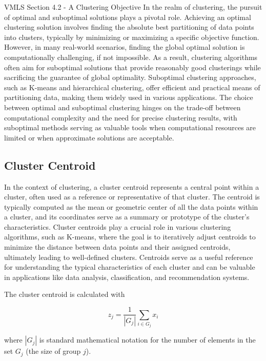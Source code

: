 \begin{notes}{VMLS Section 4.2 - A Clustering Objective}
    In the realm of clustering, the pursuit of optimal and suboptimal solutions plays a pivotal role. Achieving an optimal clustering solution involves finding the absolute best partitioning of data points 
    into clusters, typically by minimizing or maximizing a specific objective function. However, in many real-world scenarios, finding the global optimal solution is computationally challenging, if not 
    impossible. As a result, clustering algorithms often aim for suboptimal solutions that provide reasonably good clusterings while sacrificing the guarantee of global optimality. Suboptimal clustering 
    approaches, such as K-means and hierarchical clustering, offer efficient and practical means of partitioning data, making them widely used in various applications. The choice between optimal and suboptimal 
    clustering hinges on the trade-off between computational complexity and the need for precise clustering results, with suboptimal methods serving as valuable tools when computational resources are limited 
    or when approximate solutions are acceptable.

    \subsection*{Cluster Centroid}

    In the context of clustering, a cluster centroid represents a central point within a cluster, often used as a reference or representative of that cluster. The centroid is typically computed as the mean or 
    geometric center of all the data points within a cluster, and its coordinates serve as a summary or prototype of the cluster's characteristics. Cluster centroids play a crucial role in various clustering 
    algorithms, such as K-means, where the goal is to iteratively adjust centroids to minimize the distance between data points and their assigned centroids, ultimately leading to well-defined clusters. Centroids 
    serve as a useful reference for understanding the typical characteristics of each cluster and can be valuable in applications like data analysis, classification, and recommendation systems.

    \begin{Highlight}
        The cluster centroid is calculated with 

        \begin{equation*}
            z_{j} = \frac{1}{|G_{j}|} \sum_{i \in G_{j}} x_{i}
        \end{equation*}

        where $|G_{j}|$ is standard mathematical notation for the number of elements in the set $G_{j}$ (the size of group $j$).
    \end{Highlight}
\end{notes}

